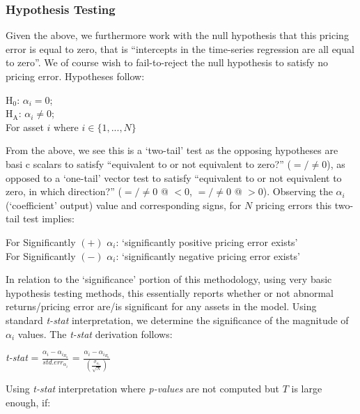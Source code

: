 \documentclass[11pt, english]{article}
\begin{document}
		\subsubsection*{Hypothesis Testing}

	Given the above, we furthermore work with the null hypothesis that this pricing error is equal to zero, that is ``intercepts in the time-series regression are all equal to zero''. We of course wish to fail-to-reject the null hypothesis to satisfy no pricing error. Hypotheses follow:

	\begin{center}
	H$_0$: $\alpha_i=0$;\\
	H$\mathrm{_A}$: $\alpha_i\neq0$;\\
	For asset $i$ where $i\in\{1,...,N\}$
	\end{center}

	From the above, we see this is a `two-tail' test as the opposing hypotheses are basi
c scalars to satisfy ``equivalent to or not equivalent to zero?'' ($=/\neq0$), as opposed to a `one-tail' vector test to satisfy ``equivalent to or not equivalent to zero, in which direction?'' ($=/\neq0$ @ $<0$, $=/\neq0$ @ $>0$). Observing the $\alpha_i$ (`coefficient' output) value and corresponding signs, for $N$ pricing errors this two-tail test implies:

	\begin{center}
	For Significantly $(+)$ $\alpha_i$: `significantly positive pricing error exists'\\
	For Significantly $(-)$ $\alpha_i$: `significantly negative pricing error exists'
	\end{center}

	In relation to the `significance' portion of this methodology, using very basic hypothesis testing methods, this essentially reports whether or not abnormal returns/pricing error are/is significant for any assets in the model. Using standard \textit{t-stat} interpretation, we determine the significance of the magnitude of $\alpha_i$ values. The \textit{t-stat} derivation follows:\\

	\begin{center}
	\textit{t-stat} = $\frac{\alpha_i-\alpha_{i_{H_0}}}{std.err_{\alpha_i}}$ = $\frac{\alpha_i-\alpha_{i_{H_0}}}{\left(\frac{\sigma_{\alpha_i}}{\sqrt{N}}\right)}$
	\end{center}

	Using \textit{t-stat} interpretation where \textit{p-values} are not computed but $T$ is large enough, if:
\end{document}
